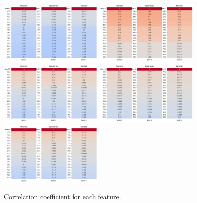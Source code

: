 \documentclass[11pt]{article}
\begin{document}
\begin{figure}[H]
  \centering
  \includegraphics[width=0.45\textwidth]{../code/Task2/Analysis/corrcoef-1.jpg}
  \includegraphics[width=0.45\textwidth]{../code/Task2/Analysis/corrcoef-2.jpg} \\
  \includegraphics[width=0.45\textwidth]{../code/Task2/Analysis/corrcoef-3.jpg}
  \includegraphics[width=0.45\textwidth]{../code/Task2/Analysis/corrcoef-4.jpg} \\
  \includegraphics[width=0.45\textwidth]{../code/Task2/Analysis/corrcoef-5.jpg}
  \caption{Correlation coefficient for each feature.}
  \label{task-2-correlation-coefficient}
\end{figure}
\end{document}

